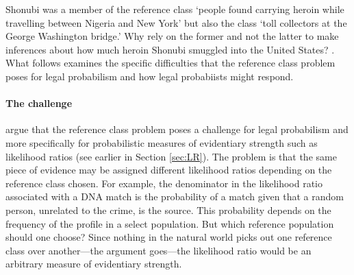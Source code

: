 \documentclass{article}
\begin{document}
%
Shonubi was a member of the reference class `people found carrying heroin while travelling between Nigeria and New York' but also the class `toll collectors at the George Washington bridge.' Why rely on the former and not the latter to make inferences about how much heroin Shonubi smuggled into the United States? 
\citep{colyvan2001crime}. 
%
%
%
%
What follows examines the specific difficulties that the reference class problem poses 
for legal probabilism and how legal probabiists might respond.

\paragraph{The challenge}
 
\citet{allen2007problematic} argue that the reference class problem poses a challenge for legal probabilism and more specifically for probabilistic measures of evidentiary strength such as likelihood ratios (see earlier in Section \ref{sec:LR}). The problem is that the same piece of evidence may be assigned different likelihood ratios depending on the reference class chosen. For example, the denominator in the likelihood ratio associated  with a DNA match  is the probability of a match given that a random person, unrelated to the crime, is the source. This probability depends on the frequency of the profile in a select population.  But which reference population should one choose?  Since nothing in the natural world picks out one reference class over another---the argument goes---the likelihood ratio would be an arbitrary measure of evidentiary strength. 
 

\end{document}
